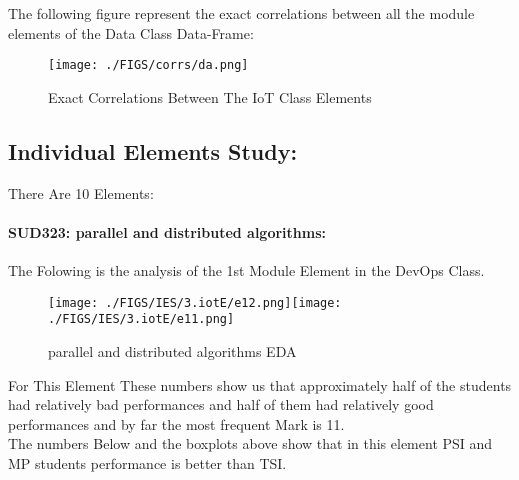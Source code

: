 \documentclass[12pt]{extreport}
\begin{document}
The following figure represent the exact correlations between all the module elements of the Data Class Data-Frame:

\begin{figure}[H]
	\centering
	\texttt{[image: ./FIGS/corrs/da.png]}
	\caption{Exact Correlations Between The IoT Class Elements}
	\label{fig:800}
\end{figure}

\subsection{Individual Elements Study:}

There Are 10 Elements:


\paragraph{\large SUD323: parallel and distributed algorithms:\\
} The Folowing is the analysis of the 1st Module Element in the DevOps Class.

\begin{figure}[H]
	\centering
	\texttt{[image: ./FIGS/IES/3.iotE/e12.png]}\texttt{[image: ./FIGS/IES/3.iotE/e11.png]}
	\caption{parallel and distributed algorithms EDA}
	\label{fig:30}
\end{figure}



For This Element
 These numbers show us that approximately half of the students had relatively bad performances and half of them had relatively good performances and by far the most frequent Mark is 11.\\
 
 The numbers Below and the boxplots above show that in this element  PSI and MP students performance is  better than TSI.
\end{document}
